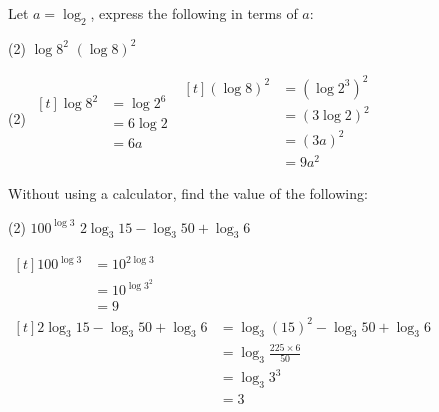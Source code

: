 \documentclass{report}
\begin{document}
\begin{question}
	Let $a = \log_2$, express the following in terms of $a$:
	\begin{tasks}[label=(\alph*)](2)
		\task $\log 8^2$
		\task $\left(\log 8\right)^2$
	\end{tasks}
	
	\sol{}
	\begin{tasks}[label=(\alph*)](2)
		\task $\begin{aligned}[t]
		\log 8^2 &= \log 2^6 \\
		&= 6 \log 2 \\
		&= 6 a
		\end{aligned}$
		\task $\begin{aligned}[t]
		\left(\log 8\right)^2 &= \left(\log 2^3\right)^2 \\
		&= \left(3 \log 2\right)^2 \\
		& = (3a)^2\\
		&= 9 a^2
		\end{aligned}$
	\end{tasks}
\end{question}

\newpage
\begin{question}
	Without using a calculator, find the value of the following:
	\begin{tasks}[label=(\alph*)](2)
		\task $100^{\log 3}$
		\task $2 \log _3 15-\log _3 50+\log _3 6$
	\end{tasks}
	
	\sol{}
	\begin{tasks}[label=(\alph*)]
		\task $\begin{aligned}[t]
		100^{\log 3} & =10^{2 \log 3} \\
		& =10^{\log 3^2} \\
		& =9
		\end{aligned}$
		\task $\begin{aligned}[t]
		2 \log _3 15-\log _3 50+\log _3 6 & =\log _3(15)^2-\log _3 50+\log _3 6 \\
		& =\log _3 \frac{225 \times 6}{50} \\
		& =\log _3 3^3 \\
		& =3
		\end{aligned}$
	\end{tasks}
\end{question}
\end{document}
